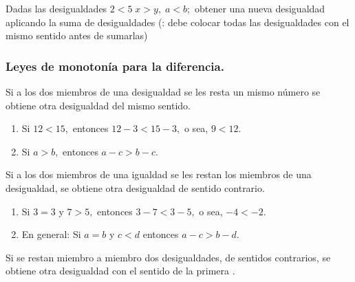 \begin{ejercicio}[]

Dadas las desigualdades $2<5\;x>y,\;a<b;$ obtener una nueva desigualdad
aplicando la suma de desigualdades (: debe colocar
todas las desigualdades con el mismo sentido antes de sumarlas)

\end{ejercicio}

\subsubsection{Leyes de monotonía para la diferencia.\vspace*{10pt}
}

\begin{ley}{}

Si a los dos miembros de una desigualdad se les resta un mismo número
se obtiene otra desigualdad del mismo sentido.

\end{ley}

\begin{ejemplos}
\begin{enumerate}
\item Si $12<15,$ entonces $12-3<15-3,$ o sea, $9<12.$
\item Si $a>b,$ entonces $a-c>b-c$.
\end{enumerate}
\end{ejemplos}

\begin{ley}{}

Si a los dos miembros de una igualdad se les restan los miembros de
una desigualdad, se obtiene otra desigualdad de sentido contrario.

\end{ley}

\begin{ejemplos}
\begin{enumerate}
\item Si $3=3$ y $7>5,$ entonces $3-7<3-5,$ o sea, $-4<-2.$
\item En general: Si $a=b$ y $c<d$ entonces $a-c>b-d$.
\end{enumerate}
\end{ejemplos}

\begin{ley}{}

Si se restan miembro a miembro dos desigualdades, de sentidos contrarios,
se obtiene otra desigualdad con el sentido de la primera .

\end{ley}

